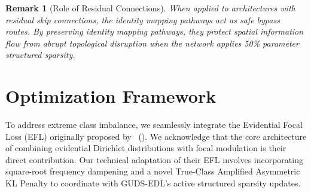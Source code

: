 \documentclass[letterpaper]{article} %
\newtheorem{remark}{Remark}
\begin{document}
\begin{remark}[Role of Residual Connections]
When applied to architectures with residual skip connections, the identity mapping pathways act as safe bypass routes. By preserving identity mapping pathways, they protect spatial information flow from abrupt topological disruption when the network applies 50\% parameter structured sparsity.
\end{remark}

\section{Optimization Framework}\label{sec:optimization}

To address extreme class imbalance, we seamlessly integrate the Evidential Focal Loss (EFL) originally proposed by \citeauthor{zhou2023domain}~(\citeyear{zhou2023domain}). We acknowledge that the core architecture of combining evidential Dirichlet distributions with focal modulation is their direct contribution. Our technical adaptation of their EFL involves incorporating square-root frequency dampening and a novel True-Class Amplified Asymmetric KL Penalty to coordinate with GUDS-EDL's active structured sparsity updates.
\end{document}
